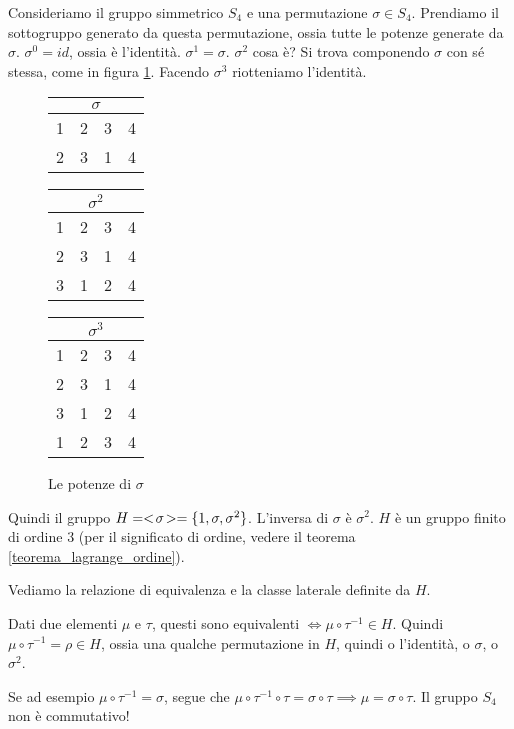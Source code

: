\begin{exmp}
Consideriamo il gruppo simmetrico $S_4$ e una permutazione $\sigma \in S_4$. Prendiamo il sottogruppo generato da questa permutazione, ossia tutte le potenze generate da $\sigma$. $\sigma^{0} = id$, ossia \`e l'identit\`a. $\sigma^{1} = \sigma$. $\sigma^{2}$ cosa \`e? Si trova componendo $\sigma$ con s\'e stessa, come in figura \ref{fig:potenze_sigma}. Facendo $\sigma^{3}$ riotteniamo l'identit\`a.

\begin{figure}[ht]
\centering
\begin{tabular}{cccc}
\multicolumn{4}{c}{$\sigma$} \\
\hline
1 & 2 & 3 & 4 \\
2 & 3 & 1 & 4 
\end{tabular}
\qquad
\begin{tabular}{cccc}
\multicolumn{4}{c}{$\sigma^{2}$} \\
\hline
1 & 2 & 3 & 4 \\
2 & 3 & 1 & 4 \\
3 & 1 & 2 & 4
\end{tabular}
\qquad
\begin{tabular}{cccc}
\multicolumn{4}{c}{$\sigma^{3}$} \\
\hline
1 & 2 & 3 & 4 \\
2 & 3 & 1 & 4 \\
3 & 1 & 2 & 4 \\
1 & 2 & 3 & 4 
\end{tabular}
\caption{\label{fig:potenze_sigma}Le potenze di $\sigma$}
\end{figure}

Quindi il gruppo $H = <\!{\sigma}\!> = \{ 1 , \sigma, \sigma^{2} \}$. L'inversa di $\sigma$ \`e $\sigma^{2}$. $H$ \`e un gruppo finito di ordine 3 (per il significato di ordine, vedere il teorema \ref{teorema_lagrange_ordine}).

Vediamo la relazione di equivalenza e la classe laterale definite da $H$.

Dati due elementi $\mu$  e $\tau$, questi sono equivalenti $ \iff \mu \circ \tau^{-1} \in H$. Quindi $\mu \circ \tau^{-1} = \rho \in H$, ossia una qualche permutazione in $H$, quindi o l'identit\`a, o $\sigma$, o $\sigma^{2}$.

Se ad esempio $\mu \circ \tau^{-1} = \sigma$, segue che $\mu \circ \tau^{-1} \circ \tau = \sigma \circ \tau \implies \mu = \sigma \circ \tau$. Il gruppo $S_4$ non \`e commutativo!


\end{exmp}
